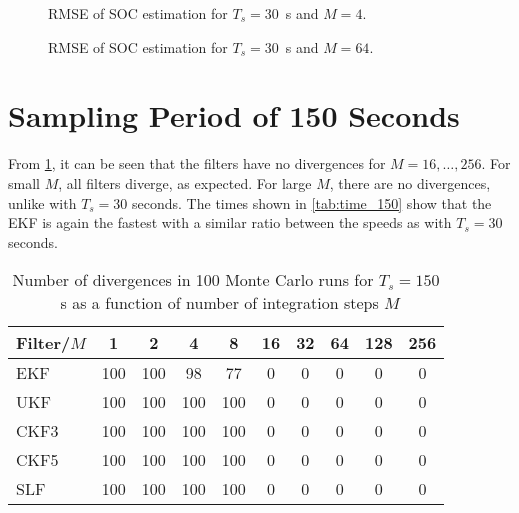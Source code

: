 \documentclass[../zhang_thesis.tex]{subfiles}
\begin{document}
\begin{figure}[h]
\centering
%
\caption{RMSE of SOC estimation for $T_s=30$~s and $M=4$.}
\label{fig:rmse_30_4}
\end{figure}

\begin{figure}
\centering
%
\caption{RMSE of SOC estimation for $T_s=30$~s and $M=64$.}
\label{fig:rmse_30_64}
\end{figure}

\clearpage

\section{Sampling Period of 150 Seconds}

From \cref{tab:div_150}, it can be seen that the filters have no divergences for $M=16,\dots,256$. For small $M$, all filters diverge, as expected. For large $M$, there are no divergences, unlike with $T_s=30$ seconds. The times shown in \cref{tab:time_150} show that the EKF is again the fastest with a similar ratio between the speeds as with $T_s=30$ seconds. 

\begin{table}[h]
\centering
\caption{Number of divergences in 100 Monte Carlo runs for $T_s=150$~s as a function of number of integration steps $M$}
\begin{tabular}{@{}l*{9}{c}@{}}
\toprule
Filter/$M$ & 1   & 2   & 4   & 8   & 16 & 32 & 64 & 128 & 256 \\
\midrule
EKF        & 100 & 100 & 98  & 77  & 0  & 0  & 0  & 0   & 0   \\
UKF        & 100 & 100 & 100 & 100 & 0  & 0  & 0  & 0   & 0   \\
CKF3       & 100 & 100 & 100 & 100 & 0  & 0  & 0  & 0   & 0   \\
CKF5       & 100 & 100 & 100 & 100 & 0  & 0  & 0  & 0   & 0   \\
SLF        & 100 & 100 & 100 & 100 & 0  & 0  & 0  & 0   & 0   \\
\bottomrule
\end{tabular}
\label{tab:div_150}
\end{table}
\end{document}
